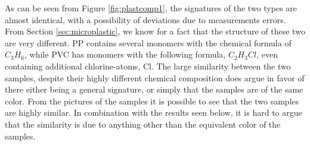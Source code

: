 \noindent
As can be seen from Figure \ref{fig:plastcomp1}, the signatures of the two types are almost identical, with a possibility of deviations due to measurements errors. From Section \ref{sec:microplastic}, we know for a fact that the structure of these two are very different. PP contains several monomers with the chemical formula of $C_3H_6$, while PVC has monomers with the following formula, $C_2H_3Cl$, even containing additional chlorine-atoms, Cl.  The large similarity between the two samples, despite their highly different chemical composition does argue in favor of there either being a general signature, or simply that the samples are of the same color. From the pictures of the samples it is possible to see that the two samples are highly similar. In combination with the results seen below, it is hard to argue that the similarity is due to anything other than the equivalent color of the samples. 


